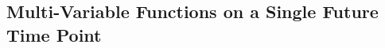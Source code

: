 \documentclass[10pt,a4paper]{paper}
\theoremstyle{definition}
\newcommand{\states}{\mathcal{X}}
\newcommand{\gambles}{\mathcal{L}}
\begin{document}
%
%

\subsection{Multi-Variable Functions on a Single Future Time Point}\label{sec:function_single_future_multiple_past}
\end{document}
